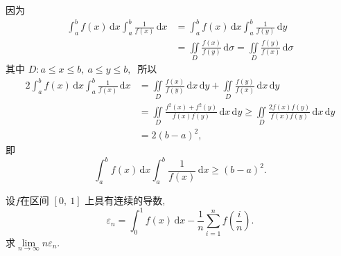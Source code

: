 	\begin{solution}
		因为
		\begin{align*}
			\int_{a}^{b} f(x) \,\text{d} x \int_{a}^{b} \frac{1}{f(x)} \,\text{d} x &=\int_{a}^{b} f(x) \,\text{d} x \int_{a}^{b} \frac{1}{f(y)} \,\text{d} y \\
			&=\iint\limits_{D} \frac{f(x)}{f(y)} \,\text{d} \sigma=\iint\limits_{D} \frac{f(y)}{f(x)} \,\text{d} \sigma
		\end{align*}
		其中 $ D: a \leqslant x \leqslant b,\  a \leqslant y \leqslant b ,\ $ 所以
		\begin{align*}
			2 \int_{a}^{b} f(x) \,\text{d} x \int_{a}^{b} \frac{1}{f(x)} \,\text{d} x &=\iint\limits_{D} \frac{f(x)}{f(y)} \,\text{d} x \,\text{d} y+\iint\limits_{D} \frac{f(y)}{f(x)} \,\text{d} x \,\text{d} y \\
			&=\iint\limits_{D} \frac{f^{2}(x)+f^{2}(y)}{f(x) f(y)} \,\text{d} x \,\text{d} y \geqslant \iint\limits_{D} \frac{2 f(x) f(y)}{f(x) f(y)} \,\text{d} x \,\text{d} y \\
			&=2(b-a)^{2},\ 
		\end{align*}
		即
		$$\int_{a}^{b} f(x) \,\text{d} x \int_{a}^{b} \frac{1}{f(x)} \,\text{d} x \geqslant(b-a)^{2}.$$
	\end{solution}
	\newpage
	\begin{problem}
		设$  f  $在区间 $ [0,\ 1] $ 上具有连续的导数,\ 
		$$\varepsilon_{n}=\int_{0}^{1} f(x) \,\text{d} x-\frac{1}{n} \sum_{i=1}^{n} f\left(\frac{i}{n}\right).$$
		求$  \lim\limits _{n \rightarrow \infty} n \varepsilon_{n}.$
	\end{problem}
	
